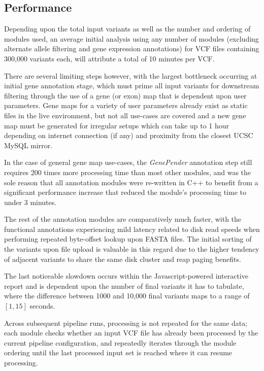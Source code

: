 \subsection{Performance}



Depending upon the total input variants as well as the number and ordering of modules used, an average initial analysis using any number of modules (excluding alternate allele filtering and gene expression annotations) for VCF files containing 300,000 variants each, will attribute a total of 10 minutes per VCF.

There are several limiting steps however, with the largest bottleneck occurring at initial gene annotation stage, which must prime all input variants for downstream filtering through the use of a gene (or exon) map that is dependent upon user parameters. Gene maps for a variety of user parameters already exist as static files in the live environment, but not all use-cases are covered and a new gene map must be generated for irregular setups which can take up to 1 hour depending on internet connection (if any) and proximity from the closest UCSC MySQL mirror.

In the case of general gene map use-cases, the \textit{GenePender} annotation step still requires 200 times more processing time than most other modules, and was the sole reason that all annotation modules were re-written in C++ to benefit from a significant performance increase that reduced the module's processing time to under 3 minutes. 

The rest of the annotation modules are comparatively much faster, with the functional annotations experiencing mild latency related to disk read speeds when performing repeated byte-offset lookup upon FASTA files. The initial sorting of the variants upon file upload is valuable in this regard due to the higher tendency of adjacent variants to share the same disk cluster and reap paging benefits.

The last noticeable slowdown occurs within the Javascript-powered interactive report and is dependent upon the number of final variants it has to tabulate, where the difference between 1000 and 10,000 final variants maps to a range of $[1,15]$ seconds.

Across subsequent pipeline runs, processing is not repeated for the same data; each module checks whether an input VCF file has already been processed by the current pipeline configuration, and repeatedly iterates through the module ordering until the last processed input set is reached where it can resume processing.




